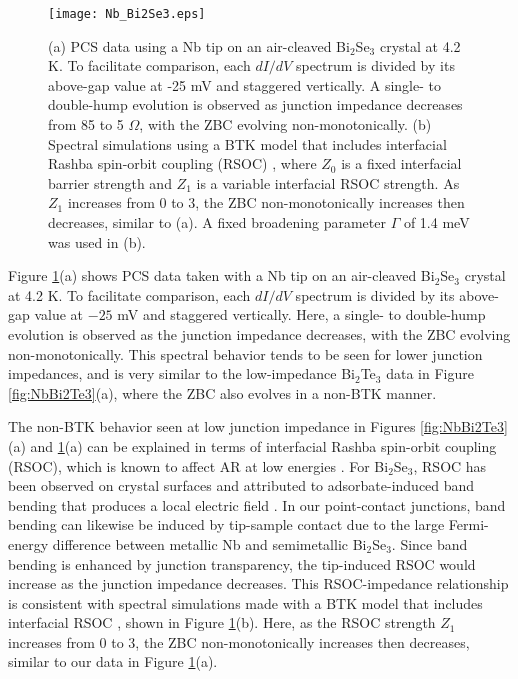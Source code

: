 \documentclass[aps,prl,twocolumn,showpacs,amsmath,amssymb,superscriptaddress,citeautoscript]{revtex4-1}
\begin{document}
\begin{figure}[ht]
\texttt{[image: Nb\_Bi2Se3.eps]}
\caption{\label{fig:NbBi2Se3} 
(a) PCS data using a Nb tip on an air-cleaved Bi$_{2}$Se$_{3}$ crystal at 4.2 K.  To facilitate comparison, each $dI/dV$ spectrum is divided by its above-gap value at -25 mV and staggered vertically. A single- to double-hump evolution is observed as junction impedance decreases from 85 to 5 $\Omega$, with the ZBC evolving non-monotonically. (b) Spectral simulations using a BTK model that includes interfacial Rashba spin-orbit coupling (RSOC) \cite{Wu2010}, where $Z_0$ is a fixed interfacial barrier strength and $Z_1$ is a variable interfacial RSOC strength. As $Z_1$ increases from 0 to 3, the ZBC non-monotonically increases then decreases, similar to (a). A fixed broadening parameter $\Gamma$ of 1.4 meV was used in (b).}
\end{figure}


Figure \ref{fig:NbBi2Se3}(a) shows PCS data taken with a Nb tip on an air-cleaved Bi$_{2}$Se$_{3}$ crystal at 4.2 K.  To facilitate comparison, each $dI/dV$ spectrum is divided by its above-gap value at $-25$ mV and staggered vertically. Here, a single- to double-hump evolution is observed as the junction impedance decreases, with the ZBC evolving non-monotonically. This spectral behavior tends to be seen for lower junction impedances, and is very similar to the low-impedance Bi$_{2}$Te$_{3}$ data in Figure \ref{fig:NbBi2Te3}(a), where the ZBC also evolves in a non-BTK manner.

The non-BTK behavior seen at low junction impedance in Figures \ref{fig:NbBi2Te3}(a) and \ref{fig:NbBi2Se3}(a) can be explained in terms of interfacial Rashba spin-orbit coupling (RSOC), which is known to affect AR at low energies \cite{Yokoyama2006,Wu2010,Kononov2013,Hoegl2015}.  For Bi$_{2}$Se$_{3}$, RSOC has been observed on crystal surfaces and attributed to adsorbate-induced band bending that produces a local electric field \cite{Benia2011}. In our point-contact junctions, band bending can likewise be induced by tip-sample contact due to the large Fermi-energy difference between metallic Nb and semimetallic Bi$_{2}$Se$_{3}$.  Since band bending is enhanced by junction transparency, the tip-induced RSOC would increase as the junction impedance decreases. This RSOC-impedance relationship is consistent with spectral simulations made with a BTK model that includes interfacial RSOC \cite{Wu2010}, shown in Figure \ref{fig:NbBi2Se3}(b). Here, as the RSOC strength $Z_1$ increases from 0 to 3, the ZBC non-monotonically increases then decreases, similar to our data in Figure \ref{fig:NbBi2Se3}(a).
\end{document}
